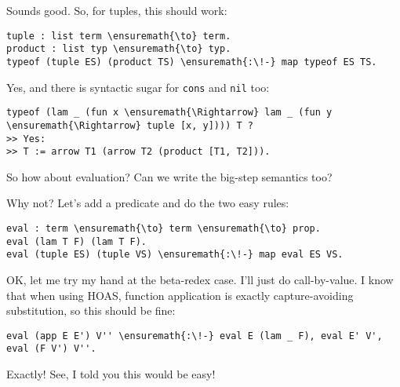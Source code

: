 \heroSTUDENT{} Sounds good. So, for tuples, this should work:

\importantCodeblock{}

\begin{verbatim}
tuple : list term \ensuremath{\to} term.
product : list typ \ensuremath{\to} typ.
typeof (tuple ES) (product TS) \ensuremath{:\!-} map typeof ES TS.
\end{verbatim}

\importantCodeblockEnd{}

\heroADVISOR{} Yes, and there is syntactic sugar for \texttt{cons} and
\texttt{nil} too:

\begin{verbatim}
typeof (lam _ (fun x \ensuremath{\Rightarrow} lam _ (fun y \ensuremath{\Rightarrow} tuple [x, y]))) T ?
>> Yes:
>> T := arrow T1 (arrow T2 (product [T1, T2])).
\end{verbatim}

\heroSTUDENT{} So how about evaluation? Can we write the big-step semantics
too?

\heroADVISOR{} Why not? Let's add a predicate and do the two easy rules:

\importantCodeblock{}

\begin{verbatim}
eval : term \ensuremath{\to} term \ensuremath{\to} prop.
eval (lam T F) (lam T F).
eval (tuple ES) (tuple VS) \ensuremath{:\!-} map eval ES VS.
\end{verbatim}

\importantCodeblockEnd{}

\heroSTUDENT{} OK, let me try my hand at the beta-redex case. I'll just do
call-by-value. I know that when using HOAS, function application is
exactly capture-avoiding substitution, so this should be fine:

\importantCodeblock{}

\begin{verbatim}
eval (app E E') V'' \ensuremath{:\!-} eval E (lam _ F), eval E' V', eval (F V') V''.
\end{verbatim}

\importantCodeblockEnd{}

\heroADVISOR{} Exactly! See, I told you this would be easy!
